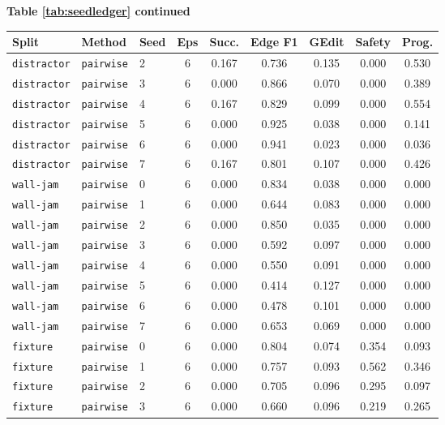 \documentclass{article}
\begin{document}
\begin{center}
\textbf{Table \ref{tab:seedledger} continued}\\[0.4ex]
\begin{tabular}{lllcccccc}
\toprule
Split & Method & Seed & Eps & Succ. & Edge F1 & GEdit & Safety & Prog. \\
\midrule
\texttt{distractor} & \texttt{pairwise} & 2 & 6 & 0.167 & 0.736 & 0.135 & 0.000 & 0.530 \\
\texttt{distractor} & \texttt{pairwise} & 3 & 6 & 0.000 & 0.866 & 0.070 & 0.000 & 0.389 \\
\texttt{distractor} & \texttt{pairwise} & 4 & 6 & 0.167 & 0.829 & 0.099 & 0.000 & 0.554 \\
\texttt{distractor} & \texttt{pairwise} & 5 & 6 & 0.000 & 0.925 & 0.038 & 0.000 & 0.141 \\
\texttt{distractor} & \texttt{pairwise} & 6 & 6 & 0.000 & 0.941 & 0.023 & 0.000 & 0.036 \\
\texttt{distractor} & \texttt{pairwise} & 7 & 6 & 0.167 & 0.801 & 0.107 & 0.000 & 0.426 \\
\texttt{wall-jam} & \texttt{pairwise} & 0 & 6 & 0.000 & 0.834 & 0.038 & 0.000 & 0.000 \\
\texttt{wall-jam} & \texttt{pairwise} & 1 & 6 & 0.000 & 0.644 & 0.083 & 0.000 & 0.000 \\
\texttt{wall-jam} & \texttt{pairwise} & 2 & 6 & 0.000 & 0.850 & 0.035 & 0.000 & 0.000 \\
\texttt{wall-jam} & \texttt{pairwise} & 3 & 6 & 0.000 & 0.592 & 0.097 & 0.000 & 0.000 \\
\texttt{wall-jam} & \texttt{pairwise} & 4 & 6 & 0.000 & 0.550 & 0.091 & 0.000 & 0.000 \\
\texttt{wall-jam} & \texttt{pairwise} & 5 & 6 & 0.000 & 0.414 & 0.127 & 0.000 & 0.000 \\
\texttt{wall-jam} & \texttt{pairwise} & 6 & 6 & 0.000 & 0.478 & 0.101 & 0.000 & 0.000 \\
\texttt{wall-jam} & \texttt{pairwise} & 7 & 6 & 0.000 & 0.653 & 0.069 & 0.000 & 0.000 \\
\texttt{fixture} & \texttt{pairwise} & 0 & 6 & 0.000 & 0.804 & 0.074 & 0.354 & 0.093 \\
\texttt{fixture} & \texttt{pairwise} & 1 & 6 & 0.000 & 0.757 & 0.093 & 0.562 & 0.346 \\
\texttt{fixture} & \texttt{pairwise} & 2 & 6 & 0.000 & 0.705 & 0.096 & 0.295 & 0.097 \\
\texttt{fixture} & \texttt{pairwise} & 3 & 6 & 0.000 & 0.660 & 0.096 & 0.219 & 0.265 \\

\end{tabular}
\end{center}
\end{document}
